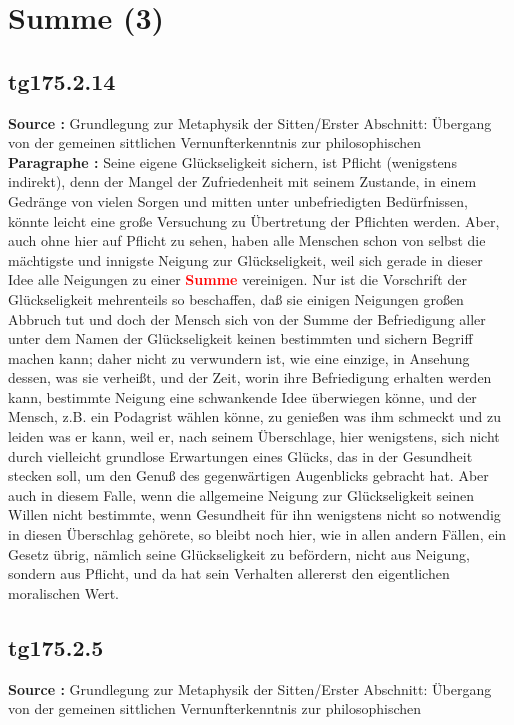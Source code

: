 \documentclass[a4paper,12pt,twoside]{book}
\newcommand{\match}[1]{\textcolor{red}{\textbf{#1}}}
\newcommand{\unnumberedsection}[1]{
	\section*{#1}
	\addcontentsline{toc}{section}{#1}
	\markright{#1}
}
\begin{document}
	\unnumberedsection{Summe (3)} 
	\subsection*{tg175.2.14} 
	\textbf{Source : }Grundlegung zur Metaphysik der Sitten/Erster Abschnitt: Übergang von der gemeinen sittlichen Vernunfterkenntnis zur philosophischen\\  
	
	\textbf{Paragraphe : }Seine eigene Glückseligkeit sichern, ist Pflicht (wenigstens indirekt), denn der Mangel der Zufriedenheit mit seinem Zustande, in einem Gedränge von vielen Sorgen und mitten unter unbefriedigten Bedürfnissen, könnte leicht eine große Versuchung zu Übertretung der Pflichten werden. Aber, auch ohne hier auf Pflicht zu sehen, haben alle Menschen schon von selbst die mächtigste und innigste Neigung zur Glückseligkeit, weil sich gerade in dieser Idee alle Neigungen zu einer \match{Summe} vereinigen. Nur ist die Vorschrift der Glückseligkeit mehrenteils so beschaffen, daß sie einigen Neigungen großen Abbruch tut und doch der Mensch sich von der Summe der Befriedigung aller unter dem Namen der Glückseligkeit keinen bestimmten und sichern Begriff machen kann; daher nicht zu verwundern ist, wie eine einzige, in Ansehung dessen, was sie verheißt, und der Zeit, worin ihre Befriedigung erhalten werden kann, bestimmte Neigung eine schwankende Idee überwiegen könne, und der Mensch, z.B. ein Podagrist wählen könne, zu genießen was ihm schmeckt und zu leiden was er kann, weil er, nach seinem Überschlage, hier wenigstens, sich nicht durch vielleicht grundlose Erwartungen eines Glücks, das in der Gesundheit stecken soll, um den Genuß des gegenwärtigen Augenblicks gebracht hat. Aber auch in diesem Falle, wenn die allgemeine Neigung zur Glückseligkeit seinen Willen nicht bestimmte, wenn Gesundheit für ihn wenigstens nicht so notwendig in diesen Überschlag gehörete, so bleibt noch hier, wie in allen andern Fällen, ein Gesetz übrig, nämlich seine Glückseligkeit zu befördern, nicht aus Neigung, sondern aus Pflicht, und da hat sein Verhalten allererst den eigentlichen moralischen Wert. 
	
	\subsection*{tg175.2.5} 
	\textbf{Source : }Grundlegung zur Metaphysik der Sitten/Erster Abschnitt: Übergang von der gemeinen sittlichen Vernunfterkenntnis zur philosophischen\\  
	
\end{document}
